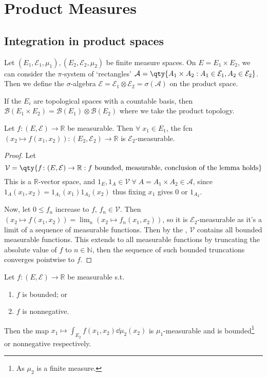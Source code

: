 \section{Product Measures}
\subsection{Integration in product spaces}
Let $(E_1, \mathcal E_1, \mu_1), (E_2, \mathcal E_2, \mu_2)$ be finite measure spaces.
On $E = E_1 \times E_2$, we can consider the $\pi$-system of `rectangles' $\mathcal A = \qty{A_1 \times A_2 : A_1 \in \mathcal E_1, A_2 \in \mathcal E_2}$.
Then we define the $\sigma$-algebra $\mathcal{E} = \mathcal E_1 \otimes \mathcal E_2 = \sigma(\mathcal A)$ on the product space.

If the $E_i$ are topological spaces with a countable basis, then $\mathcal B(E_1 \times E_2) = \mathcal B(E_1) \otimes \mathcal B(E_2)$ where we take the product topology.

\begin{lemma}
	Let $f \colon (E, \mathcal E) \to \mathbb R$ be measurable.
	Then $\forall \; x_1 \in E_1$, the fcn $(x_2 \mapsto f(x_1, x_2)) \colon (E_2, \mathcal E_2) \to \mathbb R$ is $\mathcal E_2$-measurable.
\end{lemma}

\begin{proof}
	Let
	\[ \mathcal V = \qty{f \colon (E,\mathcal E) \to \mathbb R : f \text{ bounded, measurable, conclusion of the lemma holds}} \]
	This is a $\mathbb R$-vector space, and $1_E, 1_A \in \mathcal{V} \ \forall \; A = A_1 \times A_2 \in \mathcal A$, since $1_A(x_1, x_2) = 1_{A_1}(x_1) 1_{A_2}(x_2)$ thus fixing $x_1$ gives $0$ or $1_{A_2}$.

	Now, let $0 \leq f_n$ increase to $f$, $f_n \in \mathcal V$.
	Then $(x_2 \mapsto f(x_1, x_2)) = \lim_n (x_2 \mapsto f_n(x_1, x_2))$, so it is $\mathcal E_2$-measurable as it's a limit of a sequence of measurable functions.
	Then by the , $\mathcal V$ contains all bounded measurable functions.
	This extends to all measurable functions by truncating the absolute value of $f$ to $n \in \mathbb N$, then the sequence of such bounded truncations converges pointwise to $f$.
\end{proof}

\begin{lemma} \label{lem:4-2}
	Let $f \colon (E, \mathcal E) \to \mathbb R$ be measurable s.t.
	\begin{enumerate}
		\item $f$ is bounded; or
		\item $f$ is nonnegative.
	\end{enumerate}
	Then the map $x_1 \mapsto \int_{E_2} f(x_1,x_2) \dd{\mu_2(x_2)}$ is $\mu_1$-measurable and is bounded\footnote{As $\mu_2$ is a finite measure.} or nonnegative respectively.
\end{lemma}

